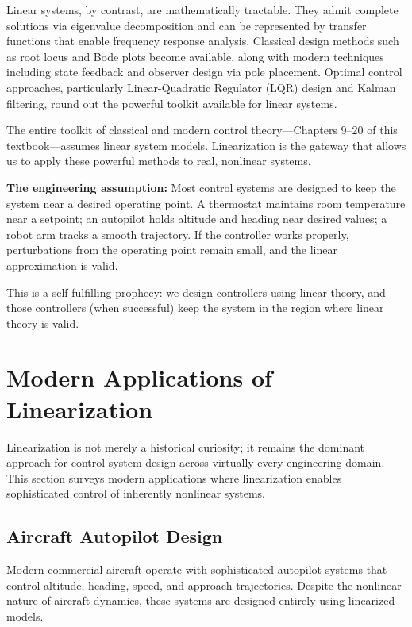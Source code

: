 Linear systems, by contrast, are mathematically tractable. They admit complete solutions via eigenvalue decomposition and can be represented by transfer functions that enable frequency response analysis. Classical design methods such as root locus and Bode plots become available, along with modern techniques including state feedback and observer design via pole placement. Optimal control approaches, particularly Linear-Quadratic Regulator (LQR) design and Kalman filtering, round out the powerful toolkit available for linear systems.

The entire toolkit of classical and modern control theory---Chapters 9--20 of this textbook---assumes linear system models. Linearization is the gateway that allows us to apply these powerful methods to real, nonlinear systems.

\textbf{The engineering assumption:} Most control systems are designed to keep the system near a desired operating point. A thermostat maintains room temperature near a setpoint; an autopilot holds altitude and heading near desired values; a robot arm tracks a smooth trajectory. If the controller works properly, perturbations from the operating point remain small, and the linear approximation is valid.

This is a self-fulfilling prophecy: we design controllers using linear theory, and those controllers (when successful) keep the system in the region where linear theory is valid.

\section{Modern Applications of Linearization}
\label{sec:linearization_applications}

Linearization is not merely a historical curiosity; it remains the dominant approach for control system design across virtually every engineering domain. This section surveys modern applications where linearization enables sophisticated control of inherently nonlinear systems.

\subsection{Aircraft Autopilot Design}

Modern commercial aircraft operate with sophisticated autopilot systems that control altitude, heading, speed, and approach trajectories. Despite the nonlinear nature of aircraft dynamics, these systems are designed entirely using linearized models.


